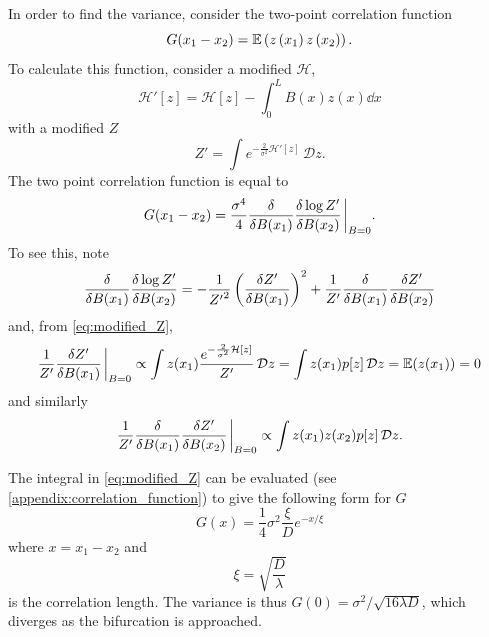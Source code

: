 In order to find the variance, consider the two-point correlation function
\begin{equation}
  \label{eq:two_point_corr}
  G(x_1 - x_2) = \operatorname*{\mathbb{E}} \left(z\left(x_1\right)z\left(x_2\right)\right).
\end{equation}
To calculate this function, consider a modified $\mathcal{H}$,
\begin{equation}
  \label{eq:modified_H}
  \mathcal{H}'[z] = \mathcal{H}[z] - \int_0^L B(x) z(x) \dd{x}
\end{equation}
with a modified $Z$
\begin{equation}
  \label{eq:modified_Z}
  Z' = \int e^{-\frac{2}{\sigma^2} \mathcal{H}'[z]}\,\mathcal{D}z.
\end{equation}
The two point correlation function is equal \parencite{Goldenfeld1992} to
\begin{equation}
  \label{eq:two_point_from_partition}
  G(x_1-x_2) = \frac{\sigma^4}{4}\fdv{B(x_1)}\fdv{\log Z'}{B(x_2)} \eval_{B=0}.
\end{equation}
To see this, note
\begin{equation}
  \label{eq:log_deriv}
  \fdv{B(x_1)}\fdv{\log Z'}{B(x_2)} =  -\frac{1}{{Z'}^2}\left(\fdv{Z'}{B(x_1)}\right)^2 + \frac{1}{Z'}\fdv{B(x_1)}\fdv{Z'}{B(x_2)}
\end{equation}
and, from \cref{eq:modified_Z},
\begin{equation}
  \label{eq:log_deriv_first}
  \frac{1}{Z'}\fdv{Z'}{B(x_1)}\eval_{B=0} \propto \int z(x_1) \frac{e^{-\frac{2}{\sigma^2} \mathcal{H}[z]}}{Z'}\,\mathcal{D}z = \int z(x_1) p[z] \,\mathcal{D}z = \E(z(x_1)) = 0
\end{equation}
and similarly
\begin{equation}
  \label{eq:log_deriv_second}
  \frac{1}{Z'}\fdv{B(x_1)}\fdv{Z'}{B(x_2)}\eval_{B=0} \propto \int z(x_1)z(x_2) p[z]\,\mathcal{D}z .
\end{equation}

The integral in \cref{eq:modified_Z} can be evaluated (see \cref{appendix:correlation_function}) to give the following form for $G$
\begin{equation}
  \label{eq:two_point_correlation_actual}
  G(x) = \frac{1}{4} \sigma^2 \frac{\xi}{D} e^{-x/\xi}
\end{equation}
where $x = x_1 - x_2$ and
\begin{equation}
  \label{eq:corr_len}
  \xi = \sqrt{\frac{D}{\lambda}}
\end{equation}
is the correlation length. The variance is thus $G(0) = \sigma^2/\sqrt{16\lambda D}$, which diverges as the bifurcation is approached.
